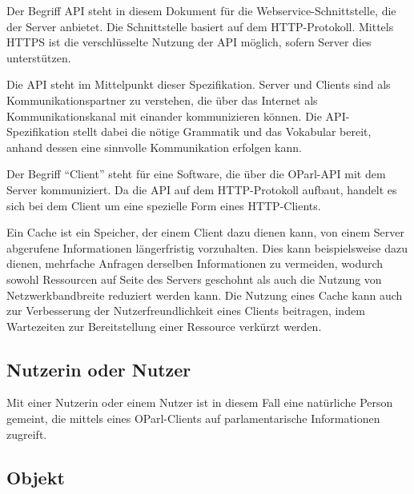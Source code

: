 \documentclass[,a4paper]{article}
\begin{document}
Der Begriff API steht in diesem Dokument für die
Webservice-Schnittstelle, die der Server anbietet. Die Schnittstelle
basiert auf dem HTTP-Protokoll. Mittels HTTPS ist die verschlüsselte
Nutzung der API möglich, sofern Server dies unterstützen.

Die API steht im Mittelpunkt dieser Spezifikation. Server und Clients
sind als Kommunikationspartner zu verstehen, die über das Internet als
Kommunikationskanal mit einander kommunizieren können. Die
API-Spezifikation stellt dabei die nötige Grammatik und das Vokabular
bereit, anhand dessen eine sinnvolle Kommunikation erfolgen kann.


Der Begriff ``Client'' steht für eine Software, die über die OParl-API
mit dem Server kommuniziert. Da die API auf dem HTTP-Protokoll aufbaut,
handelt es sich bei dem Client um eine spezielle Form eines
HTTP-Clients.


Ein Cache ist ein Speicher, der einem Client dazu dienen kann, von einem
Server abgerufene Informationen längerfristig vorzuhalten. Dies kann
beispielsweise dazu dienen, mehrfache Anfragen derselben Informationen
zu vermeiden, wodurch sowohl Ressourcen auf Seite des Servers geschohnt
als auch die Nutzung von Netzwerkbandbreite reduziert werden kann. Die
Nutzung eines Cache kann auch zur Verbesserung der Nutzerfreundlichkeit
eines Clients beitragen, indem Wartezeiten zur Bereitstellung einer
Ressource verkürzt werden.

\subsection{Nutzerin oder Nutzer}\label{nutzerin}

Mit einer Nutzerin oder einem Nutzer ist in diesem Fall eine natürliche
Person gemeint, die mittels eines OParl-Clients auf parlamentarische
Informationen zugreift.

\subsection{Objekt}\label{objekt}
\end{document}
